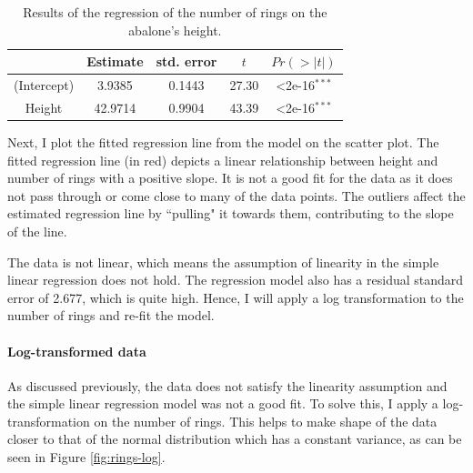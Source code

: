 \documentclass[11pt,letterpaper]{article}
\begin{document}
	\begin{table}
		\caption{Results of the regression of the number of rings on the abalone's height.}
		\centering
		\begin{tabular}{ccccc}
			\midrule
			~& Estimate & std. error & $t$ & $Pr(>|t|)$\\
			\midrule
			(Intercept) & 3.9385 & 0.1443 & 27.30 & \textless2e-16$^{***}$\\
			Height & 42.9714 & 0.9904 & 43.39 & \textless2e-16$^{***}$\\
			\midrule
		\end{tabular}
		\label{tab:ols}
	\end{table}
	
	Next, I plot the fitted regression line from the model on the scatter plot. The fitted regression line (in red) depicts a linear relationship between height and number of rings with a positive slope. It is not a good fit for the data as it does not pass through or come close to many of the data points. The outliers affect the estimated regression line by ``pulling" it towards them, contributing to the slope of the line. 
	
	The data is not linear, which means the assumption of linearity in the simple linear regression does not hold. The regression model also has a residual standard error of 2.677, which is quite high. Hence, I will apply a log transformation to the number of rings and re-fit the model. 
	
	\paragraph*{Log-transformed data}
	As discussed previously, the data does not satisfy the linearity assumption and the simple linear regression model was not a good fit. To solve this, I apply a log-transformation on the number of rings. This helps to make shape of the data closer to that of the normal distribution which has a constant variance, as can be seen in Figure \ref{fig:rings-log}. 
	
\end{document}
